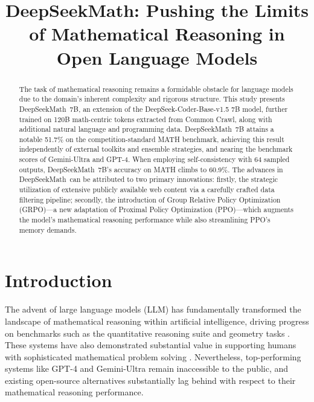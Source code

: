 \title{DeepSeekMath: Pushing the Limits of Mathematical Reasoning in Open Language Models}

\begin{abstract}
The task of mathematical reasoning remains a formidable obstacle for language models due to the domain’s inherent complexity and rigorous structure. This study presents DeepSeekMath~7B, an extension of the DeepSeek-Coder-Base-v1.5 7B model, further trained on 120B math-centric tokens extracted from Common Crawl, along with additional natural language and programming data. DeepSeekMath~7B attains a notable 51.7\% on the competition-standard MATH benchmark, achieving this result independently of external toolkits and ensemble strategies, and nearing the benchmark scores of Gemini-Ultra and GPT-4. When employing self-consistency with 64 sampled outputs, DeepSeekMath~7B’s accuracy on MATH climbs to 60.9\%. The advances in DeepSeekMath~can be attributed to two primary innovations: firstly, the strategic utilization of extensive publicly available web content via a carefully crafted data filtering pipeline; secondly, the introduction of Group Relative Policy Optimization (GRPO)—a new adaptation of Proximal Policy Optimization (PPO)—which augments the model’s mathematical reasoning performance while also streamlining PPO’s memory demands.
\end{abstract}

\section{Introduction}

The advent of large language models (LLM) has fundamentally transformed the landscape of mathematical reasoning within artificial intelligence, driving progress on benchmarks such as the quantitative reasoning suite \citep{MATH} and geometry tasks \citep{trinh2024solving}. These systems have also demonstrated substantial value in supporting humans with sophisticated mathematical problem solving \citep{tao}. Nevertheless, top-performing systems like GPT-4 \citep{gpt4} and Gemini-Ultra \citep{gemini} remain inaccessible to the public, and existing open-source alternatives substantially lag behind with respect to their mathematical reasoning performance.


